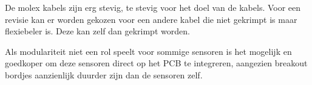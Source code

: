 De molex kabels zijn erg stevig, te stevig voor het doel van de kabels. Voor een revisie kan er worden gekozen voor een andere kabel die niet gekrimpt is maar flexiebeler is. Deze kan zelf dan gekrimpt worden. \vspace{1em}

Als modulariteit niet een rol speelt voor sommige sensoren is het mogelijk en goedkoper om deze sensoren direct op het PCB te integreren, aangezien breakout bordjes aanzienlijk duurder zijn dan de sensoren zelf.